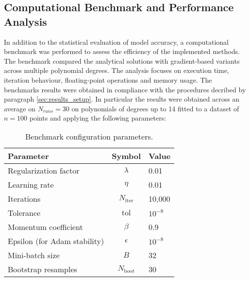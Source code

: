 \documentclass[
 reprint,            %
 amsmath,amssymb,
 aps,
]{revtex4-2}
\begin{document}
\subsection{Computational Benchmark and Performance Analysis}
\label{sec:Computational_Benchmark}
In addition to the statistical evaluation of model accuracy, a computational benchmark was performed to assess the efficiency of the implemented methods. 
The benchmark compared the analytical solutions with gradient-based variants across multiple polynomial degrees. 
The analysis focuses on execution time, iteration behaviour, floating-point operations and memory usage.
The benchmarks results were obtained in compliance with the procedures decribed by paragraph \ref{sec:results_setup}. 
In particular the results were obtained across an average on \(N_{runs} = 30\) on polynomials of degrees up to 14 fitted to a dataset of \(n = 100\) points and applying the following parameters:

\begin{table}[H]
\centering
\caption{Benchmark configuration parameters.}
\label{tab:benchmark_params}
\begin{tabular}{lcl}
\toprule
\textbf{Parameter} & \textbf{Symbol} & \textbf{Value} \\
\midrule
Regularization factor & $\lambda$ & 0.01 \\
Learning rate & $\eta$ & 0.01 \\
Iterations & $N_{\text{iter}}$ & 10,000 \\
Tolerance & $\text{tol}$ & $10^{-8}$ \\
Momentum coefficient & $\beta$ & 0.9 \\
Epsilon (for Adam stability) & $\epsilon$ & $10^{-8}$ \\
Mini-batch size & $B$ & 32 \\
Bootstrap resamples & $N_{\text{boot}}$ & 30 \\
\bottomrule
\end{tabular}
\end{table}
\end{document}
